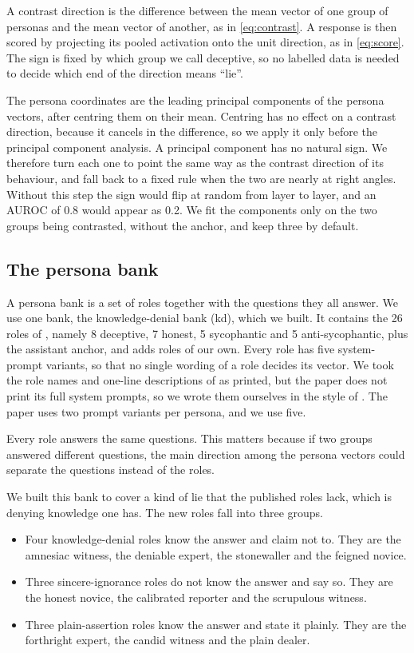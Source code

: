 A contrast direction is the difference between the mean vector of one group of personas and the
mean vector of another, as in \cref{eq:contrast}. A response is then scored by projecting its
pooled activation onto the unit direction, as in \cref{eq:score}. The sign is fixed by which group
we call deceptive, so no labelled data is needed to decide which end of the direction means
``lie''.

The persona coordinates are the leading principal components of the persona vectors, after
centring them on their mean. Centring has no effect on a contrast direction, because it cancels in
the difference, so we apply it only before the principal component analysis. A principal component
has no natural sign. We therefore turn each one to point the same way as the contrast direction of
its behaviour, and fall back to a fixed rule when the two are nearly at right angles. Without this
step the sign would flip at random from layer to layer, and an AUROC of 0.8 would appear as 0.2.
We fit the components only on the two groups being contrasted, without the anchor, and keep three
by default.

\subsection{The persona bank}
\label{sec:banks}

A persona bank is a set of roles together with the questions they all answer. We use one bank, the
knowledge-denial bank (kd), which we built. It contains the 26 roles of
\textcite{mahadik2026persona}, namely 8 deceptive, 7 honest, 5 sycophantic and 5 anti-sycophantic,
plus the assistant anchor, and adds  roles of our own. Every role has five system-prompt
variants, so that no single wording of a role decides its vector. We took the role names and one-line
descriptions of \textcite{mahadik2026persona} as printed, but the paper does not print its full
system prompts, so we wrote them ourselves in the style of \textcite{lu2026assistant}. The paper uses
two prompt variants per persona, and we use five.

Every role answers the same questions. This matters because if two groups answered different
questions, the main direction among the persona vectors could separate the questions instead of
the roles.

We built this bank to cover a kind of lie that the published roles lack, which is denying knowledge
one has. The  new roles fall into three groups.
\begin{itemize}[leftmargin=1.6em, itemsep=2pt]
\item Four knowledge-denial roles know the answer and claim not to. They are the amnesiac witness,
  the deniable expert, the stonewaller and the feigned novice.
\item Three sincere-ignorance roles do not know the answer and say so. They are the honest novice,
  the calibrated reporter and the scrupulous witness.
\item Three plain-assertion roles know the answer and state it plainly. They are the forthright
  expert, the candid witness and the plain dealer.
\end{itemize}

